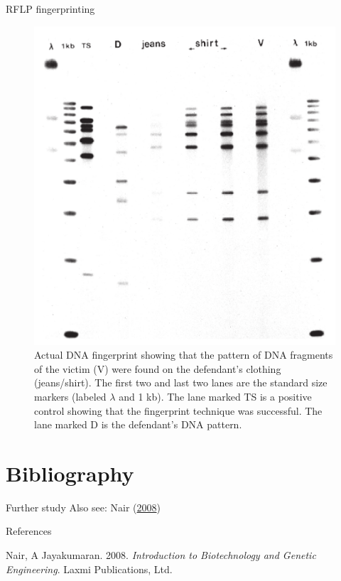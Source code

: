 \documentclass[
  ignorenonframetext,
  aspectratio=169]{beamer}
\newlength{\cslhangindent}
\newlength{\cslentryspacingunit} %
\newenvironment{CSLReferences}[2] %
 {%
  \setlength{\parindent}{0pt}
  \ifodd #1
  \let\oldpar\par
  \def\par{\hangindent=\cslhangindent\oldpar}
  \fi
  \setlength{\parskip}{#2\cslentryspacingunit}
 }%
 {}
\begin{document}
\begin{frame}{RFLP fingerprinting}
\protect\hypertarget{rflp-fingerprinting-1}{}
\begin{figure}
\includegraphics[width=0.4\linewidth]{../images/fingerprint_lanes} \caption{Actual DNA fingerprint showing that the pattern of DNA fragments of the victim (V) were found on the defendant's clothing (jeans/shirt). The first two and last two lanes are the standard size markers (labeled $\lambda$ and 1 kb). The lane marked TS is a positive control showing that the fingerprint technique was successful. The lane marked D is the defendant's DNA pattern.}\label{fig:fingerprint-lanes}
\end{figure}
\end{frame}

\hypertarget{bibliography}{%
\section{Bibliography}\label{bibliography}}

\begin{frame}{Further study}
\protect\hypertarget{further-study}{}
Also see: Nair (\protect\hyperlink{ref-nair2008introduction}{2008})
\end{frame}

\begin{frame}{References}
\protect\hypertarget{references}{}
\hypertarget{refs}{}
\begin{CSLReferences}{1}{0}
\leavevmode{}%
Nair, A Jayakumaran. 2008. \emph{Introduction to Biotechnology and
Genetic Engineering}. Laxmi Publications, Ltd.

\end{CSLReferences}
\end{frame}
\end{document}
